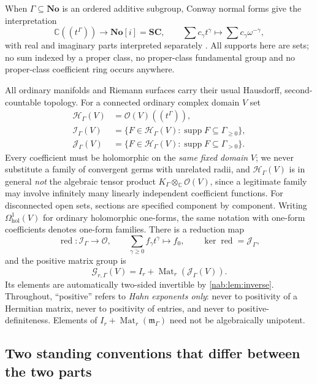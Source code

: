 \documentclass[11pt,letterpaper]{article}
\theoremstyle{definition}
\theoremstyle{remark}
\newcommand{\C}{\mathbb C}
\newcommand{\No}{\mathbf{No}}
\newcommand{\SC}{\mathbf{SC}}
\newcommand{\OO}{\mathcal O}
\newcommand{\HH}{\mathscr H_\Gamma}
\newcommand{\II}{\mathscr I_\Gamma}
\newcommand{\JJ}{\mathscr J_\Gamma}
\newcommand{\GG}{\mathscr G_{r,\Gamma}}
\newcommand{\K}{K_\Gamma}
\newcommand{\mm}{\mathfrak m_\Gamma}
\newcommand{\Mat}{\operatorname{Mat}}
\newcommand{\supp}{\operatorname{supp}}
\newcommand{\red}{\operatorname{red}}
\numberwithin{equation}{section}
\begin{document}
When $\Gamma\subseteq\No$ is an ordered additive subgroup, Conway normal forms
give the interpretation
\begin{equation}\label{nab:eq:surrealembedding}
 \C((t^\Gamma))\longrightarrow\No[i]=\SC,
 \qquad \sum c_\gamma t^\gamma\longmapsto\sum c_\gamma\omega^{-\gamma},
\end{equation}
with real and imaginary parts interpreted separately
\cite{vdDE,Poonen,Bournez}. All supports here are sets; no sum indexed by a
proper class, no proper-class fundamental group and no proper-class
coefficient ring occurs anywhere.

All ordinary manifolds and Riemann surfaces carry their usual Hausdorff,
second-countable topology. For a connected ordinary complex domain $V$ set
\begin{align}
 \HH(V)&=\OO(V)((t^\Gamma)),\label{nab:eq:H}\\
 \II(V)&=\{F\in\HH(V):\supp F\subseteq\Gamma_{\geq0}\},\label{nab:eq:I}\\
 \JJ(V)&=\{F\in\HH(V):\supp F\subseteq\Gamma_{>0}\}.\label{nab:eq:J}
\end{align}
Every coefficient must be holomorphic on the \emph{same fixed domain} $V$; we
never substitute a family of convergent germs with unrelated radii, and
$\HH(V)$ is in general \emph{not} the algebraic tensor product
$\K\otimes_\C\OO(V)$, since a legitimate family may involve infinitely many
linearly independent coefficient functions. For disconnected open sets,
sections are specified component by component. Writing
$\Omega^1_{\mathrm{hol}}(V)$ for ordinary holomorphic one-forms, the same
notation with one-form coefficients denotes one-form families. There is a
reduction map
\begin{equation}\label{nab:eq:reduction}
 \red:\II\longrightarrow\OO,\qquad
 \sum_{\gamma\geq0}f_\gamma t^\gamma\longmapsto f_0,
 \qquad\ker\red=\JJ,
\end{equation}
and the positive matrix group is
\begin{equation}\label{nab:eq:G}
 \GG(V)=I_r+\Mat_r(\JJ(V)).
\end{equation}
Its elements are automatically two-sided invertible by
\cref{nab:lem:inverse}. Throughout, ``positive'' refers to \emph{Hahn
exponents only}: never to positivity of a Hermitian matrix, never to
positivity of entries, and never to positive-definiteness. Elements of
$I_r+\Mat_r(\mm)$ need not be algebraically unipotent.

\subsection{Two standing conventions that differ between the two parts}
\label{nab:sub:conventions}
\end{document}
